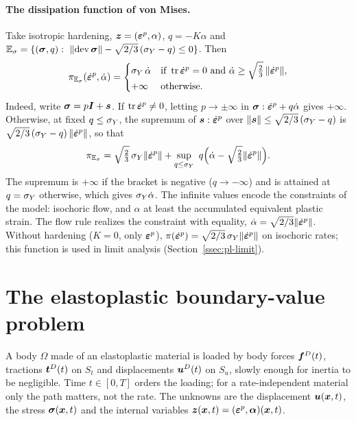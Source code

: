 \paragraph{The dissipation function of von Mises.}
\begin{example}\label{ex:pl-mises-pi}
%
Take isotropic hardening, $\bm{z}=(\bm{\varepsilon}^{p},\alpha)$, $q=-K\alpha$ and
$\Esig=\{(\sig,q):\ \norm{\dev\sig}-\sqrt{2/3}\,(\sY-q)\le0\}$. Then
\begin{equation}\label{eq:pl-mises-pi}
  \pi_{\mathbb{E}_{\sigma}}(\dot{\bm{\varepsilon}}^p,\dot\alpha)=
  \begin{cases}\sigma_{Y}\,\dot\alpha & \text{if }\operatorname{tr}\dot{\bm{\varepsilon}}^p=0\text{ and }
  \dot\alpha\ge\sqrt{\tfrac23}\,\lVert \dot{\bm{\varepsilon}}^p\rVert,\\
  +\infty & \text{otherwise.}\end{cases}
\end{equation}
Indeed, write $\bm{\sigma}=p\bm{I}+\bm{s}$. If $\operatorname{tr}\dot{\bm{\varepsilon}}^p\neq0$, letting
$p\to\pm\infty$ in $\bm{\sigma}:\dot{\bm{\varepsilon}}^p+q\dot\alpha$ gives $+\infty$. Otherwise, at
fixed $q\le\sigma_{Y}$, the supremum of $\bm{s}:\dot{\bm{\varepsilon}}^p$ over
$\lVert \bm{s}\rVert\le\sqrt{2/3}\,(\sigma_{Y}-q)$ is $\sqrt{2/3}\,(\sigma_{Y}-q)\,\lVert \dot{\bm{\varepsilon}}^p\rVert$,
so that
\[
  \pi_{\Esig}=\sqrt{\tfrac23}\,\sY\norm{\dot\eps^p}
  +\sup_{q\le\sY}\ q\Bigl(\dot\alpha-\sqrt{\tfrac23}\norm{\dot\eps^p}\Bigr).
\]
The supremum is $+\infty$ if the bracket is negative ($q\to-\infty$) and is
attained at $q=\sigma_{Y}$ otherwise, which gives $\sigma_{Y}\dot\alpha$. The infinite values
encode the constraints of the model: isochoric flow, and $\alpha$ at least the
accumulated equivalent plastic strain. The flow rule realizes the
constraint with equality, $\dot\alpha=\sqrt{2/3}\lVert \dot{\bm{\varepsilon}}^p\rVert$. Without
hardening ($K=0$, only $\bm{\varepsilon}^{p}$),
$\pi(\dot{\bm{\varepsilon}}^p)=\sqrt{2/3}\,\sigma_{Y}\lVert \dot{\bm{\varepsilon}}^p\rVert$ on isochoric rates; this
function is used in limit analysis (Section~\ref{ssec:pl-limit}).
\end{example}

\section{The elastoplastic boundary-value problem}\label{sec:pl-bvp}
%
A body $\Omega$ made of an elastoplastic material is loaded by body forces
$\bm{f}^{D}(t)$, tractions $\bm{t}^{D}(t)$ on $S_t$ and displacements $\bm{u}^{D}(t)$ on $S_u$,
slowly enough for inertia to be negligible. Time $t\in[0,T]$ orders the
loading; for a rate-independent material only the path matters, not the
rate. The unknowns are the displacement $\bm{u}(\bm{x},t)$, the stress $\bm{\sigma}(\bm{x},t)$
and the internal variables $\bm{z}(\bm{x},t)=(\bm{\varepsilon}^{p},\bm{\alpha})(\bm{x},t)$.

